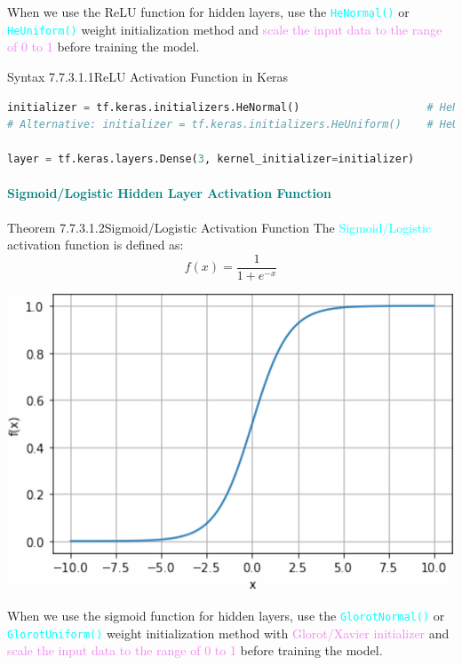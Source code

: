 \documentclass{book}
\begin{document}
When we use the ReLU function for hidden layers, use the \textcolor{cyan}{\texttt{HeNormal()}} or \textcolor{cyan}{\texttt{HeUniform()}} weight initialization method and \textcolor{violet}{scale the input data to the range of 0 to 1} before training the model.
\begin{synBox}{Syntax 7.7.3.1.1}{ReLU Activation Function in Keras}
\begin{lstlisting}[language=Python, basicstyle=\ttfamily\small, keywordstyle=\color{blue}, commentstyle=\color{forestgreen}, stringstyle=\color{red}, showstringspaces=false]
initializer = tf.keras.initializers.HeNormal()                    # HeNormal Method
# Alternative: initializer = tf.keras.initializers.HeUniform()    # HeUniform Method

layer = tf.keras.layers.Dense(3, kernel_initializer=initializer)
\end{lstlisting}
\end{synBox}
\textcolor{teal}{\paragraph{Sigmoid/Logistic Hidden Layer Activation Function}}
\begin{thmBox}{Theorem 7.7.3.1.2}{Sigmoid/Logistic Activation Function}
    The \textcolor{cyan}{Sigmoid/Logistic} activation function is defined as:
    \[
        f(x) = \frac{1}{1+e^{-x}}
    \]
    \begin{center}
        \includegraphics[scale=0.17]{chapter 7/ch7_figure33.jpeg}
    \end{center}
\end{thmBox}
When we use the sigmoid function for hidden layers, use the \textcolor{cyan}{\texttt{GlorotNormal()}} or \textcolor{cyan}{\texttt{GlorotUniform()}} weight initialization method with \textcolor{violet}{Glorot/Xavier initializer} and \textcolor{violet}{scale the input data to the range of 0 to 1} before training the model.
\end{document}
